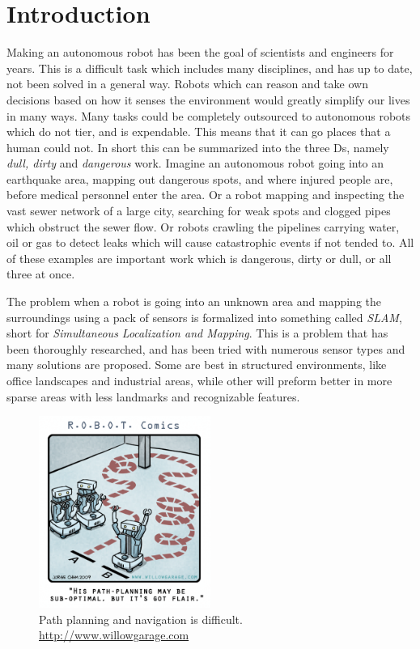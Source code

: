 
\chapter{Introduction}
Making an autonomous robot has been the goal of scientists and engineers for years. This
is a difficult task which includes many disciplines, and has up to date, not been solved in
a general way. Robots which can reason and take own decisions based on how it senses the
environment would greatly simplify our lives in many ways. Many tasks could be completely
outsourced to autonomous robots which do not tier, and is expendable. This means that it
can go places that a human could not. In short this can be summarized into the three Ds,
namely \emph{dull, dirty} and \emph{dangerous} work. Imagine an autonomous robot going
into an earthquake area, mapping out dangerous spots, and where injured people are,
before medical personnel enter the area. Or a robot mapping and inspecting the vast sewer
network of a large city, searching for weak spots and clogged pipes which obstruct the
sewer flow. Or robots crawling the pipelines carrying water, oil or gas to detect leaks
which will cause catastrophic events if not tended to. All of these examples are important work which
is dangerous, dirty or dull, or all three at once.

The problem when a robot is going into an unknown area and mapping the surroundings using
a pack of sensors is formalized into something called \emph{SLAM}, short for
\emph{Simultaneous Localization and Mapping}.
This is a problem that has been thoroughly researched, and has been tried with numerous sensor types
and many solutions are proposed. Some are best in structured environments, like office
landscapes and industrial areas, while other will preform better in more sparse areas with
less landmarks and recognizable features. 
\begin{figure}[htbp]
    \centering
    \includegraphics[width=0.5\textwidth]{pics/path_planning_comic}
    \caption[Path planning and navigation is difficult]{Path planning and navigation is difficult.
    \url{http://www.willowgarage.com}}
\end{figure}


